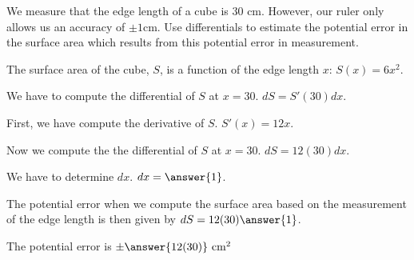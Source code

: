 \documentclass{ximera}
\author{Steven Gubkin\and Nela Lakos}
\begin{document}
\begin{exercise}
We measure that the edge length of a cube is $30 \textrm{ cm}$.
However, our ruler only allows us an accuracy of $\pm 1 \textrm{
  cm}$.  Use differentials to estimate the potential error in the
surface area which results from this potential error in measurement.
\begin{hint}
The surface area of the cube, $S$, is a function of the edge length $x$:
$S(x)=6 x^2$.
\end{hint}
\begin{hint}
We have to compute the differential of $S$  at $x=30$.
$dS=S'(30)dx$.
\end{hint}
\begin{hint}
First, we have compute the derivative of $S$.
$S'(x)=12 x$.
\end{hint}
\begin{hint}
Now we  compute the the differential of $S$  at $x=30$.
$dS=12(30)dx$.
\end{hint}
\begin{hint}
We have to determine $dx$.
$dx=\answer{1}$.
\end{hint}
\begin{hint}
The potential error when we compute the surface area based on the measurement of the edge length  is then given by
$dS=12(30)\answer{1}$.
\end{hint}
\begin{prompt}
	The potential error is $\pm \answer{12(30)} \textrm{ cm}^2$ 
\end{prompt}

\end{exercise}
\end{document}
